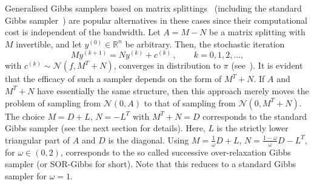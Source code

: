 \documentclass[
fontsize=11pt,
paper=a4,
numbers=noenddot
]{scrartcl}
\begin{document}

Generalised Gibbs samplers based on matrix splittings~\cite{foxparker} (including the standard Gibbs sampler~\cite{gemangeman}) are popular alternatives in these cases since their computational cost is independent of the bandwidth. Let $A = M - N$ be a matrix splitting with $M$ invertible, and let $y^{(0)} \in \mathbb{R}^n$ be arbitrary. Then, the stochastic iteration
\begin{equation}
    \label{eq:stochasticit}
    M y^{(k+1)} = N y^{(k)} + c^{(k)}\,,\qquad k = 0,1,2, \dotsc,
\end{equation}
with $c^{(k)} \sim \mathcal{N}(f, M^T + N)$, converges in distribution to $\pi$ (see~\cite[Thm.\ 2]{foxparker}). It is evident that the efficacy of such a sampler depends on the form of $M^T + N$. If $A$ and $M^T + N$ have essentially the same structure, then this approach merely moves the problem of sampling from $\mathcal{N}(0, A)$ to that of sampling from $\mathcal{N}(0, M^T + N)$. The choice $M = D + L$, $N = -L^T$ with $M^T + N = D$ corresponds to the standard Gibbs sampler (see the next section for details). Here, $L$ is the strictly lower triangular part of $A$ and $D$ is the diagonal. Using $M = \frac{1}{\omega} D + L$, $N = \frac{1-\omega}{\omega} D - L^T$, for $\omega \in (0,2)$, corresponds to the so called successive over-relaxation Gibbs sampler (or SOR-Gibbs for short). Note that this reduces to a standard Gibbs sampler for $\omega = 1$.
\end{document}
